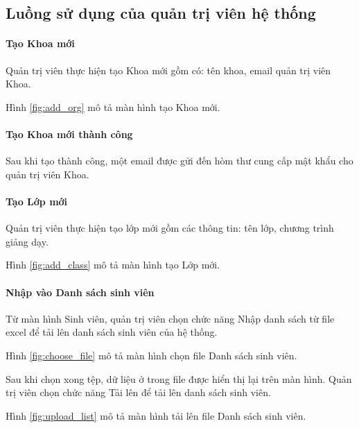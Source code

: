 \documentclass[./../main.tex]{subfiles}
\begin{document}
\subsection{Luồng sử dụng của quản trị viên hệ thống}

\paragraph*{Tạo Khoa mới}

Quản trị viên thực hiện tạo Khoa mới gồm có: tên khoa, email quản trị viên Khoa.

Hình \ref{fig:add_org} mô tả màn hình tạo Khoa mới.

\paragraph*{Tạo Khoa mới thành công}

Sau khi tạo thành công, một email được gửi đến hòm thư cung cấp mật khẩu cho quản trị viên Khoa.


\paragraph*{Tạo Lớp mới}

Quản trị viên thực hiện tạo lớp mới gồm các thông tin: tên lớp, chương trình giảng dạy.

Hình \ref{fig:add_class} mô tả màn hình tạo Lớp mới.

\paragraph*{Nhập vào Danh sách sinh viên}

Từ màn hình Sinh viên, quản trị viên chọn chức năng Nhập danh sách từ file excel để tải lên danh sách sinh viên của hệ thống.

Hình \ref{fig:choose_file} mô tả màn hình chọn file Danh sách sinh viên.

Sau khi chọn xong tệp, dữ liệu ở trong file được hiển thị lại trên màn hình. Quản trị viên chọn chức năng Tải lên để tải lên danh sách sinh viên.

Hình \ref{fig:upload_list} mô tả màn hình tải lên file Danh sách sinh viên.
\end{document}
